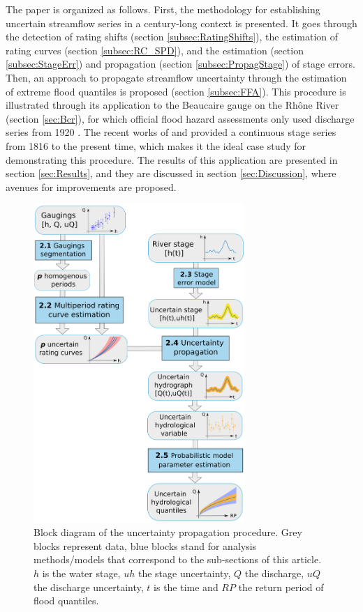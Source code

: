 \documentclass[11pt]{article}
\begin{document}
    The paper is organized as follows. First, the methodology for establishing uncertain streamflow series in a century-long context is presented. It goes through the detection of rating shifts (section \ref{subsec:RatingShifts}), the estimation of rating curves (section \ref{subsec:RC_SPD}), and the estimation (section \ref{subsec:StageErr}) and propagation (section \ref{subsec:PropagStage}) of stage errors. Then, an approach to propagate streamflow uncertainty through the estimation of extreme flood quantiles is proposed (section \ref{subsec:FFA}). This procedure is illustrated through its application to the Beaucaire gauge on the Rhône River (section \ref{sec:Bcr}), for which official flood hazard assessments only used discharge series from 1920 \citep{rigaudiere_etude_2000}. The recent works of \citet{pichard_hydro-climatology_2017} and \citet{bard_actualisation_2018} provided a continuous stage series from 1816 to the present time, which makes it the ideal case study for demonstrating this procedure. The results of this application are presented in section \ref{sec:Results}, and they are discussed in section \ref{sec:Discussion}, where avenues for improvements are proposed.

    \begin{figure}[h!]
    \centering
        \includegraphics[width = 8cm]{Figs/1-uTotSchema.png}
        \caption{Block diagram of the uncertainty propagation procedure. Grey blocks represent data, blue blocks stand for analysis methods/models that correspond to the sub-sections of this article. $h$ is the water stage, $uh$ the stage uncertainty, $Q$ the discharge, $uQ$ the discharge uncertainty, $t$ is the time and $RP$ the return period of flood quantiles.}
        \label{fig:ChProp}
    \end{figure}
\end{document}
